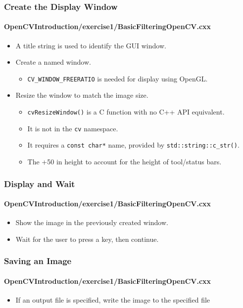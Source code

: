 \begin{frame}
\frametitle{Create the Display Window}
\framesubtitle{OpenCVIntroduction/exercise1/BasicFilteringOpenCV.cxx}
\begin{center}
\begin{itemize}
\item A title string is used to identify the GUI window.
\pause
\item Create a named window.
  \begin{itemize}
  \item {\tt\small CV\_WINDOW\_FREERATIO} is needed for display using OpenGL.
  \end{itemize}
\pause
\item Resize the window to match the image size.
  \begin{itemize}
  \item {\tt\small cvResizeWindow()} is a C function with no C++ API equivalent.
  \item It is not in the {\tt\small cv} namespace.
  \item It requires a {\tt\small const char*} name, provided by {\tt\small std::string::c\_str()}.
  \item The +50 in height to account for the height of tool/status bars.
  \end{itemize}
\end{itemize}
\end{center}
\end{frame}


\begin{frame}
\frametitle{Display and Wait}
\framesubtitle{OpenCVIntroduction/exercise1/BasicFilteringOpenCV.cxx}
\begin{center}
\begin{itemize}
\item Show the image in the previously created window.
\pause
\item Wait for the user to press a key, then continue.
\end{itemize}
\end{center}
\end{frame}


\begin{frame}
\frametitle{Saving an Image}
\framesubtitle{OpenCVIntroduction/exercise1/BasicFilteringOpenCV.cxx}
\begin{center}
\begin{itemize}
\item If an output file is specified, write the image to the specified file
\end{itemize}
\end{center}
\end{frame}


